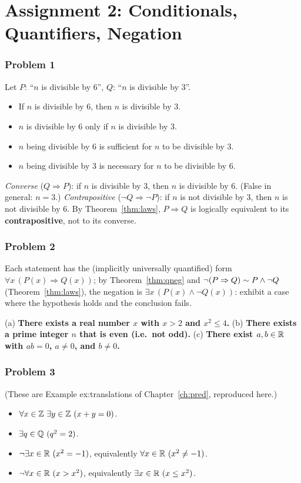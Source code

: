 \chapter{Assignment 2: Conditionals, Quantifiers, Negation}\label{ch:sol2}

\subsection*{Problem 1}
Let $P$: ``$n$ is divisible by $6$'', $Q$: ``$n$ is divisible by $3$''.
\begin{itemize}
	\item[(a)] If $n$ is divisible by $6$, then $n$ is divisible by $3$.
	\item[(b)] $n$ is divisible by $6$ only if $n$ is divisible by $3$.
	\item[(c)] $n$ being divisible by $6$ is sufficient for $n$ to be divisible by $3$.
	\item[(d)] $n$ being divisible by $3$ is necessary for $n$ to be divisible by $6$.
\end{itemize}
\emph{Converse} ($Q\Rightarrow P$): if $n$ is divisible by $3$, then $n$ is divisible by $6$. (False in general: $n=3$.)
\emph{Contrapositive} ($\neg Q\Rightarrow\neg P$): if $n$ is not divisible by $3$, then $n$ is not divisible by $6$.
By Theorem~\ref{thm:laws}, $P\Rightarrow Q$ is logically equivalent to its \textbf{contrapositive}, not to its converse.

\subsection*{Problem 2}
Each statement has the (implicitly universally quantified) form $\forall x\,(P(x)\Rightarrow Q(x))$; by Theorem~\ref{thm:qneg} and $\neg(P\Rightarrow Q)\sim P\wedge\neg Q$ (Theorem~\ref{thm:laws}), the negation is $\exists x\,(P(x)\wedge\neg Q(x))$: exhibit a case where the hypothesis holds and the conclusion fails.

(a) \textbf{There exists a real number $x$ with $x>2$ and $x^2\le4$.}
(b) \textbf{There exists a prime integer $n$ that is even (i.e.\ not odd).}
(c) \textbf{There exist $a,b\in\mathbb{R}$ with $ab=0$, $a\ne0$, and $b\ne0$.}

\subsection*{Problem 3}
(These are Example ex:translations of Chapter~\ref{ch:pred}, reproduced here.)
\begin{itemize}
	\item[(a)] $\forall x\in\Z\ \exists y\in\Z\ (x+y=0)$.
	\item[(b)] $\exists q\in\Q\ (q^2=2)$.
	\item[(c)] $\neg\exists x\in\mathbb{R}\ (x^2=-1)$, equivalently $\forall x\in\R\ (x^2\ne-1)$.
	\item[(d)] $\neg\forall x\in\R\ (x>x^2)$, equivalently $\exists x\in\mathbb{R}\ (x\le x^2)$.
\end{itemize}

